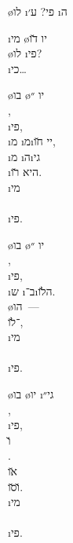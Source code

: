  \o{לו}  \i{פי}?
ע׳ \i{ה}

\i{מי} \o{יו} \u{דו} \\
\o{לו}  \i{פי}?\\
\i{כי}…

\o{בו} \o{יו} ״\\
 ,\\
  \i{פי},\\
 \i{מ}  \i{מ}\i{יי} \u{חו},\\
 \i{מ} \i{ה}\i{גי}\\
 \i{היא} \u{רו}.\\
\i{מי}\\
\\
\i{פי}.

\o{בו} \o{יו} ״\\
 ,\\
  \i{פי},\\
 \i{ש} \i{ב}־\i{ה}\u{לו}.\\
 \o{הו}~—  \\
־\u{לו},\\
\i{מי}\\
\\
\i{פי}.

\o{בו} \o{יו} \i{גי}״\\
 ,\\
  \i{פי},\\
 \u{ו} \\
.\\
\u{או}   \\
 \u{ו}\u{סו}.\\
\i{מי}\\
\\
\i{פי}.

